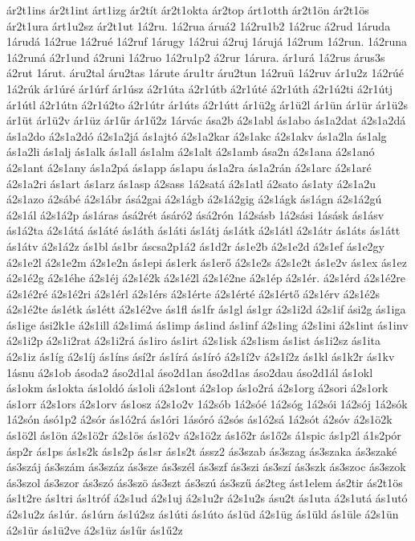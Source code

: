 {ár2t1ins
ár2t1int
árt1izg
ár2tít
ár2t1okta
ár2top
árt1otth
ár2t1ön
ár2t1ös
ár2t1ura
árt1u2sz
ár2t1ut
1á2ru.
1á2rua
áruá2
1á2ru1b2
1á2ruc
á2rud
1áruda
1árudá
1á2rue
1á2rué
1á2ruf
1árugy
1á2rui
á2ruj
1árujá
1á2rum
1á2run.
1á2runa
1á2runá
á2r1und
á2runi
1á2ruo
1á2ru1p2
á2rur
1árura.
ár1urá
1á2rus
árus3s
á2rut
1árut.
áru2tal
áru2tas
1árute
áru1tr
áru2tun
1á2ruü
1á2ruv
ár1u2z
1á2rúé
1á2rúk
ár1úré
ár1úrf
ár1úsz
á2r1úta
á2r1útb
á2r1úté
á2r1úth
á2r1ú2ti
á2r1útj
ár1útl
á2r1útn
á2r1ú2to
á2r1útr
ár1úts
á2r1útt
ár1ü2g
ár1ü2l
ár1ün
ár1ür
ár1ü2s
ár1üt
ár1ü2v
ár1üz
ár1űr
ár1ű2z
1árvác
ása2b
á2s1abl
ás1abo
ás1a2dat
á2s1a2dá
ás1a2do
á2s1a2dó
á2s1a2já
ás1ajtó
á2s1a2kar
á2s1akc
á2s1akv
ás1a2la
ás1alg
ás1a2li
ás1alj
ás1alk
ás1all
ás1alm
á2s1alt
á2s1amb
ása2n
á2s1ana
á2s1anó
á2s1ant
á2s1any
ás1a2pá
ás1app
ás1apu
ás1a2ra
ás1a2rán
á2s1arc
á2s1aré
á2s1a2ri
ás1art
ás1arz
ás1asp
á2sass
1á2satá
á2s1atl
á2sato
ás1aty
á2s1a2u
á2s1azo
á2sábé
á2s1ábr
ásá2gai
á2s1ágb
á2s1á2gig
á2s1ágk
ás1ágn
á2s1á2gú
á2s1ál
á2s1á2p
ás1áras
ásá2rét
ásáró2
ásá2rón
1á2sásb
1á2sási
1ásásk
ás1ásv
ás1á2ta
á2s1átá
ás1áté
ás1áth
ás1áti
ás1átj
ás1átk
á2s1átl
á2s1átr
ás1áts
ás1átt
ás1átv
á2s1á2z
ás1bl
ás1br
áscsa2p1á2
ás1d2r
ás1e2b
á2s1e2d
á2s1ef
ás1e2gy
á2s1e2l
á2s1e2m
á2s1e2n
ás1epi
ás1erk
ás1erő
á2s1e2s
á2s1e2t
ás1e2v
ás1ex
ás1ez
á2s1é2g
á2s1éhe
á2s1éj
á2s1é2k
á2s1é2l
á2s1é2ne
á2s1ép
á2s1ér.
á2s1érd
á2s1é2re
á2s1é2ré
á2s1é2ri
á2s1érl
á2s1érs
á2s1érte
á2s1érté
á2s1értő
á2s1érv
á2s1é2s
á2s1é2te
ás1étk
ás1étt
á2s1é2ve
ás1fl
ás1fr
ás1gl
ás1gr
á2s1i2d
á2s1if
ási2g
ás1iga
ás1ige
ási2k1e
á2s1ill
á2s1imá
ás1imp
ás1ind
ás1inf
á2s1ing
á2s1ini
á2s1int
ás1inv
á2s1i2p
á2s1i2rat
á2s1i2rá
ás1iro
ás1irt
á2s1isk
á2s1ism
ás1ist
ás1i2sz
ás1ita
á2s1iz
ás1íg
á2s1íj
ás1íns
ásí2r
ás1írá
ás1író
á2s1í2v
á2s1í2z
ás1kl
ás1k2r
ás1kv
1ásnu
á2s1ob
ásoda2
áso2d1al
áso2d1an
áso2d1as
áso2dau
áso2d1ál
ás1okl
ás1okm
ás1okta
ás1oldó
ás1oli
á2s1ont
á2s1op
ás1o2rá
á2s1org
á2sori
á2s1ork
ás1orr
á2s1ors
á2s1orv
ás1osz
á2s1o2v
1á2sób
1á2sóé
1á2sóg
1á2sói
1á2sój
1á2sók
1á2són
ásó1p2
á2sór
ás1ó2rá
ás1óri
1ásóró
á2sós
ás1ó2sá
1á2sót
á2sóv
á2s1ö2k
ás1ö2l
ás1ön
á2s1ö2r
á2s1ös
ás1ö2v
á2s1ö2z
ás1ő2r
ás1ő2s
á1spic
ás1p2l
á1s2pór
ásp2r
ás1ps
ás1s2k
ás1s2p
ás1sr
ás1s2t
ássz2
ás3szab
ás3szag
ás3szaka
ás3szaké
ás3száj
ás3szám
ás3száz
ás3sze
ás3szél
ás3szf
ás3szi
ás3szí
ás3szk
ás3szoc
ás3szok
ás3szol
ás3szor
ás3szó
ás3szö
ás3szt
ás3szú
ás3szű
ás2teg
ást1elem
ás2tir
ás2t1ös
ás1t2re
ás1tri
ás1tróf
á2s1ud
á2s1uj
á2s1u2r
á2s1u2s
ásu2t
ás1uta
á2s1utá
ás1utó
á2s1u2z
ás1úr.
ás1úrn
ás1ú2sz
ás1úti
ás1úto
ás1üd
á2s1üg
ás1üld
ás1üle
á2s1ün
á2s1ür
ás1ü2ve
á2s1üz
ás1űr
ás1ű2z
}
